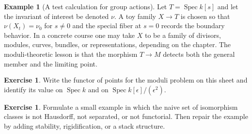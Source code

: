 \documentclass[11pt]{amsart}
\theoremstyle{definition}
\newtheorem{example}[theorem]{Example}
\newtheorem{exercise}[theorem]{Exercise}
\newcommand{\Spec}{\operatorname{Spec}}
\begin{document}
\begin{example}[A test calculation for group actions]
Let $T=\Spec k[s]$ and let the invariant of interest be denoted $\nu$.  A toy family $X\to T$ is chosen so that $\nu(X_t)=\nu_0$ for $s\ne0$ and the special fiber at $s=0$ records the boundary behavior.  In a concrete course one may take $X$ to be a family of divisors, modules, curves, bundles, or representations, depending on the chapter.  The moduli-theoretic lesson is that the morphism $T\to M$ detects both the general member and the limiting point.
\end{example}
\begin{exercise}
Write the functor of points for the moduli problem on this sheet and identify its value on $\Spec k$ and on $\Spec k[\epsilon]/(\epsilon^2)$.
\end{exercise}
\begin{exercise}
Formulate a small example in which the naive set of isomorphism classes is not Hausdorff, not separated, or not functorial.  Then repair the example by adding stability, rigidification, or a stack structure.
\end{exercise}
\clearpage
\end{document}
